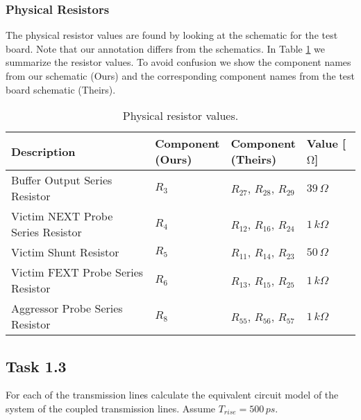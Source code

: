 \documentclass[../main.tex]{subfiles}
\begin{document}
\subsubsection{Physical Resistors}

The physical resistor values are found by looking at the schematic for the test board. Note that our annotation differs from the schematics. In Table \ref{tab:resistor-params} we summarize the resistor values. To avoid confusion we show the component names from our schematic (Ours) and the corresponding component names from the test board schematic (Theirs).

\begin{table}[h]
    \centering
    \begin{tabular}{l|l l l}
        \toprule[1pt]
        \textbf{Description} &
        \makecell[l]{\textbf{Component} \\ \textbf{(Ours)}} & 
        \makecell[l]{\textbf{Component} \\ \textbf{(Theirs)}} &  
        \textbf{Value [$\si{\ohm}$]} \\
        \midrule
        Buffer Output Series Resistor &
        $R_3$ & $R_{27}$, $R_{28}$, $R_{29}$ & $39\,\si{\Omega}$  \\
        Victim NEXT Probe Series Resistor &
        $R_4$ & $R_{12}$, $R_{16}$, $R_{24}$ & $1\,\si{k\Omega}$  \\
        Victim Shunt Resistor &
        $R_5$ & $R_{11}$, $R_{14}$, $R_{23}$ & $50\,\si{\Omega}$  \\
        Victim FEXT Probe Series Resistor &
        $R_6$ & $R_{13}$, $R_{15}$, $R_{25}$ & $1\,\si{k\Omega}$  \\
        Aggressor Probe Series Resistor &
        $R_8$ & $R_{55}$, $R_{56}$, $R_{57}$ & $1\,\si{k\Omega}$  \\
        \bottomrule[1pt]
    \end{tabular}
    \caption{Physical resistor values.}
    \label{tab:resistor-params}
\end{table}

\newpage

\subsection{Task 1.3}

For each of the transmission lines calculate the equivalent circuit model of the system of the coupled transmission lines. Assume $T_{rise} = 500\,\si{ps}$.
\end{document}
